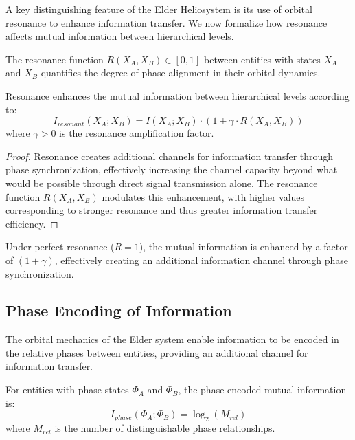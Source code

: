 A key distinguishing feature of the Elder Heliosystem is its use of orbital resonance to enhance information transfer. We now formalize how resonance affects mutual information between hierarchical levels.

\begin{definition}
The resonance function $R(X_A, X_B) \in [0, 1]$ between entities with states $X_A$ and $X_B$ quantifies the degree of phase alignment in their orbital dynamics.
\end{definition}

\begin{theorem}
Resonance enhances the mutual information between hierarchical levels according to:
\begin{equation}
I_{resonant}(X_A; X_B) = I(X_A; X_B) \cdot (1 + \gamma \cdot R(X_A, X_B))
\end{equation}
where $\gamma > 0$ is the resonance amplification factor.
\end{theorem}

\begin{proof}
Resonance creates additional channels for information transfer through phase synchronization, effectively increasing the channel capacity beyond what would be possible through direct signal transmission alone. The resonance function $R(X_A, X_B)$ modulates this enhancement, with higher values corresponding to stronger resonance and thus greater information transfer efficiency.
\end{proof}

\begin{corollary}
Under perfect resonance ($R = 1$), the mutual information is enhanced by a factor of $(1 + \gamma)$, effectively creating an additional information channel through phase synchronization.
\end{corollary}

\subsection{Phase Encoding of Information}

The orbital mechanics of the Elder system enable information to be encoded in the relative phases between entities, providing an additional channel for information transfer.

\begin{theorem}
For entities with phase states $\Phi_A$ and $\Phi_B$, the phase-encoded mutual information is:
\begin{equation}
I_{phase}(\Phi_A; \Phi_B) = \log_2(M_{rel})
\end{equation}
where $M_{rel}$ is the number of distinguishable phase relationships.
\end{theorem}


